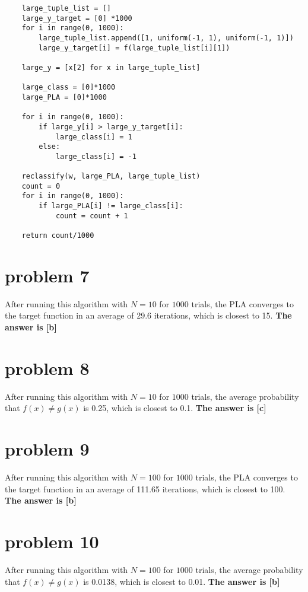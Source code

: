 \documentclass{article}
\begin{document}
\begin{verbatim}
    large_tuple_list = []
    large_y_target = [0] *1000
    for i in range(0, 1000):
        large_tuple_list.append([1, uniform(-1, 1), uniform(-1, 1)])
        large_y_target[i] = f(large_tuple_list[i][1])

    large_y = [x[2] for x in large_tuple_list] 
    
    large_class = [0]*1000
    large_PLA = [0]*1000
    
    for i in range(0, 1000):
        if large_y[i] > large_y_target[i]:
            large_class[i] = 1
        else:
            large_class[i] = -1
            
    reclassify(w, large_PLA, large_tuple_list)        
    count = 0
    for i in range(0, 1000):
        if large_PLA[i] != large_class[i]:
            count = count + 1
    
    return count/1000
\end{verbatim}
\section*{problem 7}
After running this algorithm with $N = 10$ for $1000$ trials, the PLA converges to the target function in an average of 29.6 iterations, which is closest to 15.
\newline \newline
\textbf{The answer is [b]}

\section*{problem 8}
After running this algorithm with $N = 10$ for $1000$ trials, the average probability that $f(x) \neq g(x)$ is 0.25, which is closest to 0.1.
\newline \newline
\textbf{The answer is [c]}

\section*{problem 9}
After running this algorithm with $N = 100$ for $1000$ trials, the PLA converges to the target function in an average of 111.65 iterations, which is closest to 100.
\newline \newline
\textbf{The answer is [b]}

\section*{problem 10}
After running this algorithm with $N = 100$ for $1000$ trials, the average probability that $f(x) \neq g(x)$ is 0.0138, which is closest to 0.01.
\newline \newline
\textbf{The answer is [b]}
\end{document}
